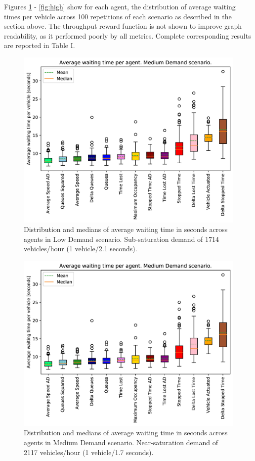 \documentclass{article}
\begin{document}
Figures \ref{fig:low} - \ref{fig:high} show for each agent, the distribution of average waiting times per vehicle across 100 repetitions of each scenario as described in the section above.
The throughput reward function is not shown to improve graph readability, as it performed poorly by all metrics. 
Complete corresponding results are reported in Table I.
\begin{figure}[thpb]
    \centering
    \includegraphics[width=0.7\linewidth]{figures/rand_2_1_ordered_color_DS.jpg}
    \caption{Distribution and medians of average waiting time in seconds across agents in Low Demand scenario. Sub-saturation demand of 1714 vehicles/hour (1 vehicle/2.1 seconds).}
    \label{fig:low}
\end{figure}

\begin{figure}[thpb]
    \centering
    \includegraphics[width=0.7\linewidth]{figures/rand_1_7_ordered_color_DS.jpg}
    \caption{Distribution and medians of average waiting time in seconds across agents in Medium Demand scenario. Near-saturation demand of 2117 vehicles/hour (1 vehicle/1.7 seconds).}
    \label{fig:mid}
\end{figure}
\end{document}
